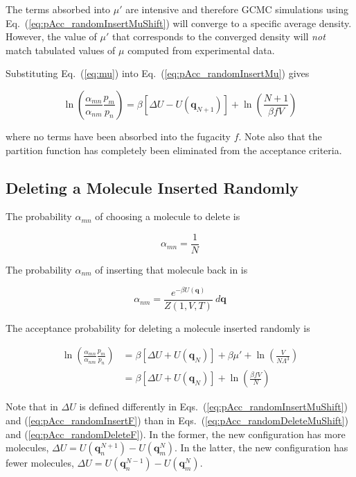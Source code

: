 The terms absorbed into $\mu'$ are intensive and therefore GCMC simulations using Eq.\ (\ref{eq:pAcc_randomInsertMuShift}) will converge to a specific average density. However, the value of $\mu'$ that corresponds to the converged density will {\em not} match tabulated values of $\mu$ computed from experimental data.

Substituting Eq.\ (\ref{eq:mu}) into Eq.\ (\ref{eq:pAcc_randomInsertMu}) gives

\begin{equation}
\label{eq:pAcc_randomInsertF}
\ln\left( \frac{\alpha_{mn}}{\alpha_{nm}} \frac{p_m}{p_n} \right) = \beta \left[\Delta U - U(\mathbf{q}_{N+1})\right] + \ln\left( \frac{N+1}{\beta f V} \right)
\end{equation}

where no terms have been absorbed into the fugacity $f$. Note also that the partition function has completely been eliminated from the acceptance criteria.

\subsection{Deleting a Molecule Inserted Randomly}
\label{sec:randomDelete}

The probability $\alpha_{mn}$ of choosing a molecule to delete is

\begin{equation}
\alpha_{mn} = \frac{1}{N}
\end{equation}

The probability $\alpha_{nm}$ of inserting that molecule back in is

\begin{equation}
\alpha_{nm} = \frac{e^{-\beta U(\mathbf{q})}}{Z(1,V,T)}\ d\mathbf{q}
\end{equation}

The acceptance probability for deleting a molecule inserted randomly is

\begin{align}
\label{eq:pAcc_randomDeleteMuShift}
\ln\left( \frac{\alpha_{mn}}{\alpha_{nm}} \frac{p_m}{p_n} \right) &= \beta \left[\Delta U + U(\mathbf{q}_{N})\right] + \beta \mu' + \ln\left( \frac{V}{N\Lambda^3} \right) \\
\label{eq:pAcc_randomDeleteF}
&= \beta \left[\Delta U + U(\mathbf{q}_{N})\right] + \ln\left( \frac{\beta f V}{N} \right)
\end{align}

Note that in $\Delta U$ is defined differently in Eqs.\ (\ref{eq:pAcc_randomInsertMuShift}) and (\ref{eq:pAcc_randomInsertF}) than in Eqs.\ (\ref{eq:pAcc_randomDeleteMuShift}) and (\ref{eq:pAcc_randomDeleteF}). In the former, the new configuration has more molecules, $\Delta U = U(\mathbf{q}_n^{N+1}) - U(\mathbf{q}_m^N)$. In the latter, the new configuration has fewer molecules, $\Delta U = U(\mathbf{q}_n^{N-1}) - U(\mathbf{q}_m^N)$.
